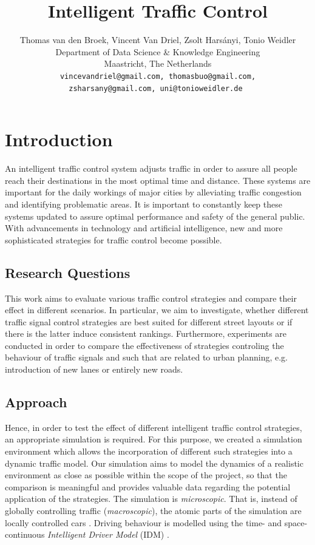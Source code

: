 \documentclass[10pt]{article}
\title{Intelligent Traffic Control}
\author{Thomas van den Broek, Vincent Van Driel, Zsolt Harsányi, Tonio Weidler\\
	Department of Data Science \& Knowledge Engineering\\
	Maastricht, The Netherlands\\
	\tt \small vincevandriel@gmail.com, thomasbuo@gmail.com,\\
	\tt \small zsharsany@gmail.com, uni@tonioweidler.de
}
\begin{document}
\maketitle
\begin{abstract}
\end{abstract}

\section{Introduction}
An intelligent traffic control system adjusts traffic in order to assure all people reach their destinations in the most optimal time and distance. These systems are important for the daily workings of major cities by alleviating traffic congestion and identifying problematic areas. It is important to constantly keep these systems updated to assure optimal performance and safety of the general public. With advancements in technology and artificial intelligence, new and more sophisticated strategies for traffic control become possible.

\subsection{Research Questions}
This work aims to evaluate various traffic control strategies and compare their effect in different scenarios. In particular, we aim to investigate, whether different traffic signal control strategies are best suited for different street layouts or if there is the latter induce consistent rankings. Furthermore, experiments are conducted in order to compare the effectiveness of strategies controling the behaviour of traffic signals and such that are related to urban planning, e.g. introduction of new lanes or entirely new roads.

\subsection{Approach}
Hence, in order to test the effect of different intelligent traffic control strategies, an appropriate simulation is required. For this purpose, we created a simulation environment which allows the incorporation of different such strategies into a dynamic traffic model. Our simulation aims to model the dynamics of a realistic environment as close as possible within the scope of the project, so that the comparison is meaningful and provides valuable data regarding the potential application of the strategies. The simulation is \textit{microscopic}. That is, instead of globally controlling traffic (\textit{macroscopic}), the atomic parts of the simulation are locally controlled cars \citep[see also][]{krajzewicz2002sumo}. Driving behaviour is modelled using the time- and space-continuous \textit{Intelligent Driver Model} (IDM) \citep{treiber2000congested}. 
\end{document}
